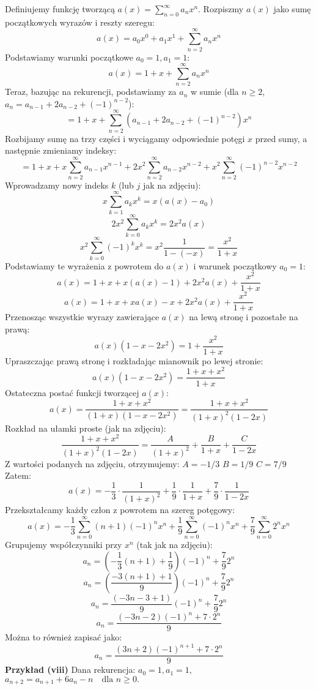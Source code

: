 \documentclass{mwart}
\begin{document}
\begin{mdframed}
    Definiujemy funkcję tworzącą $a(x) = \sum_{n=0}^{\infty} a_n x^n$.
    Rozpiszmy $a(x)$ jako sumę początkowych wyrazów i reszty szeregu:
    $$ a(x) = a_0 x^0 + a_1 x^1 + \sum_{n=2}^{\infty} a_n x^n $$
    Podstawiamy warunki początkowe $a_0 = 1, a_1 = 1$:
    $$ a(x) = 1 + x + \sum_{n=2}^{\infty} a_n x^n $$
    Teraz, bazując na rekurencji, podstawiamy za $a_n$ w sumie (dla $n \ge 2$, $a_n = a_{n-1} + 2a_{n-2} + (-1)^{n-2}$):
    $$ = 1 + x + \sum_{n=2}^{\infty} (a_{n-1} + 2a_{n-2} + (-1)^{n-2}) x^n $$
    Rozbijamy sumę na trzy części i wyciągamy odpowiednie potęgi $x$ przed sumy, a następnie zmieniamy indeksy:
    $$ = 1 + x + x \sum_{n=2}^{\infty} a_{n-1} x^{n-1} + 2x^2 \sum_{n=2}^{\infty} a_{n-2} x^{n-2} + x^2 \sum_{n=2}^{\infty} (-1)^{n-2} x^{n-2} $$
    Wprowadzamy nowy indeks $k$ (lub $j$ jak na zdjęciu):
    $$ x \sum_{k=1}^{\infty} a_k x^k = x(a(x) - a_0) $$
    $$ 2x^2 \sum_{k=0}^{\infty} a_k x^k = 2x^2 a(x) $$
    $$ x^2 \sum_{k=0}^{\infty} (-1)^k x^k = x^2 \frac{1}{1-(-x)} = \frac{x^2}{1+x} $$
    Podstawiamy te wyrażenia z powrotem do $a(x)$ i warunek początkowy $a_0=1$:
    $$ a(x) = 1 + x + x(a(x) - 1) + 2x^2 a(x) + \frac{x^2}{1+x} $$
    $$ a(x) = 1 + x + x a(x) - x + 2x^2 a(x) + \frac{x^2}{1+x} $$
    Przenosząc wszystkie wyrazy zawierające $a(x)$ na lewą stronę i pozostałe na prawą:
    $$ a(x) (1 - x - 2x^2) = 1 + \frac{x^2}{1+x} $$
    Upraszczając prawą stronę i rozkładając mianownik po lewej stronie:
    $$ a(x) (1 - x - 2x^2) = \frac{1+x+x^2}{1+x} $$
    Ostateczna postać funkcji tworzącej $a(x)$:
    $$ a(x) = \frac{1+x+x^2}{(1+x)(1 - x - 2x^2)} = \frac{1+x+x^2}{(1+x)^2 (1-2x)} $$
    Rozkład na ułamki proste (jak na zdjęciu):
    $$ \frac{1+x+x^2}{(1+x)^2 (1-2x)} = \frac{A}{(1+x)^2} + \frac{B}{1+x} + \frac{C}{1-2x} $$
    Z wartości podanych na zdjęciu, otrzymujemy:
    $A = -1/3$
    $B = 1/9$
    $C = 7/9$
    Zatem:
    $$ a(x) = -\frac{1}{3} \cdot \frac{1}{(1+x)^2} + \frac{1}{9} \cdot \frac{1}{1+x} + \frac{7}{9} \cdot \frac{1}{1-2x} $$
    Przekształcamy każdy człon z powrotem na szereg potęgowy:
    $$ a(x) = -\frac{1}{3} \sum_{n=0}^{\infty} (n+1)(-1)^n x^n + \frac{1}{9} \sum_{n=0}^{\infty} (-1)^n x^n + \frac{7}{9} \sum_{n=0}^{\infty} 2^n x^n $$
    Grupujemy współczynniki przy $x^n$ (tak jak na zdjęciu):
    $$ a_n = \left(-\frac{1}{3}(n+1) + \frac{1}{9}\right)(-1)^n + \frac{7}{9}2^n $$
    $$ a_n = \left(\frac{-3(n+1)+1}{9}\right)(-1)^n + \frac{7}{9}2^n $$
    $$ a_n = \frac{(-3n-3+1)}{9}(-1)^n + \frac{7}{9}2^n $$
    $$ a_n = \frac{(-3n-2)(-1)^n + 7 \cdot 2^n}{9} $$
    Można to również zapisać jako:
    $$ a_n = \frac{ (3n+2)(-1)^{n+1} + 7 \cdot 2^n }{9} $$
    \textbf{Przykład (viii)}\newline
    Dana rekurencja:
    $a_0 = 1, a_1 = 1,$
    $a_{n+2} = a_{n+1} + 6a_n - n \quad \text{dla } n \ge 0.$


\end{mdframed}
\end{document}
